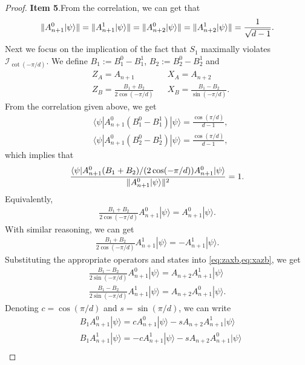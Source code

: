 \documentclass[11pt,letterpaper]{article}
\newcommand{\ket}[1]{|#1\rangle}
\newcommand{\bra}[1]{\langle#1|}
\DeclarePairedDelimiter{\norm}{\lVert}{\rVert}
\newcommand{\1}{\mathbb{1}}
\newcommand{\I}{\mathcal{I}}
\theoremstyle{definition}
\begin{document}
\begin{proof}
	\textbf{Item 5}.From the correlation, we can get that 
	\begin{align}
	\norm{A_{n+1}^0 \ket{\psi}} = \norm{A_{n+1}^1 \ket{\psi}} =\norm{A_{n+2}^0 \ket{\psi}} = \norm{A_{n+2}^1 \ket{\psi}} = \frac{1}{\sqrt{d-1}}.
	\end{align}
	Next we focus on the implication of the fact that $S_1$ maximally violates $\I_{\cot(-\pi/d)}$.
	We define $B_1 := B_1^0 - B_1^1$, $B_2 := B_2^0-B_2^1$ and
	\begin{align}
		&Z_A  = A_{n+1} && X_A = A_{n+2} \\
		&Z_B = \frac{B_1+B_2}{2\cos(-\pi/d)} && X_B = \frac{B_1-B_2}{\sin(-\pi/d)}.
	\end{align}
	From the correlation given above, we get 
         \begin{align}
         	&\bra{\psi} A_{n+1}^0 (B_1^0 - B_1^1) \ket{\psi} = \frac{\cos(\pi/d)}{d-1},\\
        		&\bra{\psi} A_{n+1}^0 (B_2^0 - B_2^1) \ket{\psi} = \frac{\cos(\pi/d)}{d-1},
         \end{align}
        which implies that 
        \begin{align}
        		\frac{\bra{\psi} A_{n+1}^0 (B_1 + B_2)/(2\cos(-\pi/d)) A_{n+1}^0 \ket{\psi}}{\norm{A_{n+1}^0 \ket{\psi}}^2} = 1.
        \end{align}
        Equivalently,
        \begin{align}
        		\frac{B_1+B_2}{2 \cos(-\pi/d)} A_{n+1}^0 \ket{\psi} = A_{n+1}^0 \ket{\psi}.
        \end{align}
        With similar reasoning, we can get
        \begin{align}
        		\frac{B_1+B_2}{2 \cos(-\pi/d)} A_{n+1}^1 \ket{\psi} = -A_{n+1}^1 \ket{\psi}.
        \end{align}
	Substituting the appropriate operators and states into \cref{eq:zaxb,eq:xazb}, we get
	\begin{align}
		\frac{B_1-B_2}{2 \sin(-\pi/d)} A_{n+1}^0\ket{\psi} =A_{n+2} A_{n+1}^1\ket{\psi}\\
		\frac{B_1 -B_2}{2\sin(-\pi/d)} A_{n+1}^1 \ket{\psi} = A_{n+2} A_{n+1}^0 \ket{\psi}.
	\end{align}
	Denoting $c = \cos(\pi/d)$ and $s = \sin(\pi/d)$, we can write 
        \begin{align}
        		&B_1A_{n+1}^0 \ket{\psi} = cA_{n+1}^0\ket{\psi} - sA_{n+2}A_{n+1}^1\ket{\psi}\\
        		&B_1A_{n+1}^1 \ket{\psi} = -cA_{n+1}^1\ket{\psi} - sA_{n+2}A_{n+1}^0\ket{\psi}\\

\end{align}
\end{proof}
\end{document}
